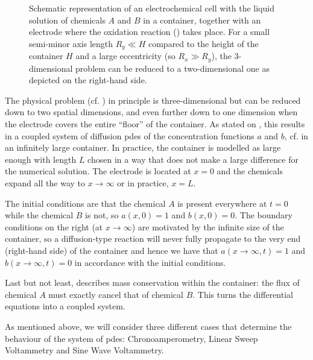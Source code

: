 \documentclass{prettytex/ox/mmsc-special-topic}
\begin{document}
  \begin{figure}[H]
    \centering
    \caption{Schematic representation of an electrochemical cell with the liquid solution of chemicals $A$ and $B$ in a container, together with an electrode where the oxidation reaction () takes place. For a small semi-minor axis length $R_y \ll H$ compared to the height of the container $H$ and a large eccentricity (so $R_x \gg R_y$), the 3-dimensional problem can be reduced to a two-dimensional one as depicted on the right-hand side.}
    \label{fig:battery-schema}
  \end{figure}

  The physical problem (cf. ) in principle is three-dimensional but can be reduced down to two spatial dimensions, and even further down to one dimension when the electrode covers the entire ``floor'' of the container.
  As stated on , this results in a coupled system of diffusion \gls{pde}s of the concentration functions $a$ and $b$, cf.  in an infinitely large container.
  In practice, the container is modelled as large enough with length $L$ chosen in a way that does not make a large difference for the numerical solution.
  The electrode is located at $x = 0$ and the chemicals expand all the way to $x \rightarrow \infty$ or in practice, $x = L$.

  The initial conditions are that the chemical $A$ is present everywhere at $t=0$ while the chemical $B$ is not, so $a(x, 0) = 1$ and $b(x, 0) = 0$.
  The boundary conditions on the right (at $x \rightarrow \infty$) are motivated by the infinite size of the container, so a diffusion-type reaction will never fully propagate to the very end (right-hand side) of the container and hence we have that $a(x\rightarrow\infty, t) = 1$ and $b(x\rightarrow\infty, t) = 0$ in accordance with the initial conditions.

  Last but not least,  describes mass conservation within the container: the flux of chemical $A$ must exactly cancel that of chemical $B$. This turns the differential equations into a coupled system.

  As mentioned above, we will consider three different cases that determine the behaviour of the system of \gls{pde}s: Chronoamperometry, Linear Sweep Voltammetry and Sine Wave Voltammetry.
\end{document}
